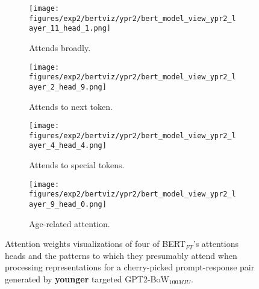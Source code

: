 \begin{figure}[H]
     \centering
     \begin{subfigure}[b]{0.22\textwidth}
        \centering
        \texttt{[image: figures/exp2/bertviz/ypr2/bert\_model\_view\_ypr2\_layer\_11\_head\_1.png]}
        \captionsetup{font=footnotesize,labelfont=footnotesize}
        \caption{Attends broadly.}
        \label{subfig:bertviz_model_view_ypr2_broad}
     \end{subfigure}
     \quad
     \begin{subfigure}[b]{0.22\textwidth}
        \centering
        \texttt{[image: figures/exp2/bertviz/ypr2/bert\_model\_view\_ypr2\_layer\_2\_head\_9.png]}
        \captionsetup{font=footnotesize,labelfont=footnotesize}
        \caption{Attends to next token.}
        \label{subfig:bertviz_model_view_ypr2_next}
     \end{subfigure}
    \quad
    \begin{subfigure}[b]{0.22\textwidth}
        \centering
        \texttt{[image: figures/exp2/bertviz/ypr2/bert\_model\_view\_ypr2\_layer\_4\_head\_4.png]}
        \captionsetup{font=footnotesize,labelfont=footnotesize}
        \caption{Attends to special tokens.}
        \label{subfig:bertviz_model_view_ypr2_special}
     \end{subfigure}
    \quad
     \begin{subfigure}[b]{0.22\textwidth}
        \centering
        \texttt{[image: figures/exp2/bertviz/ypr2/bert\_model\_view\_ypr2\_layer\_9\_head\_0.png]}
        \captionsetup{font=footnotesize,labelfont=footnotesize}
        \caption{Age-related attention.}
        \label{subfig:bertviz_model_view_ypr2_age}
     \end{subfigure}
    \caption{Attention weights visualizations of four of BERT$_{FT}$'s attentions heads and the patterns to which they presumably attend when processing representations for a cherry-picked prompt-response pair generated by \textbf{younger} targeted GPT2-BoW$_{100MIU}$.}
    \label{fig:bertviz_model_view_ypr2}
\end{figure}


